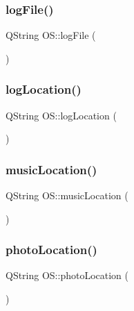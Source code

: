 \mbox{\label{classOS_a85848812c46025d92b9a061df85d9bce}} 
\subsubsection{\texorpdfstring{log\+File()}{logFile()}}
{\footnotesize\ttfamily Q\+String O\+S\+::log\+File (\begin{DoxyParamCaption}{ }\end{DoxyParamCaption})}

\mbox{\label{classOS_a5f0bcd7c973d5875be519ec3a06629f2}} 
\subsubsection{\texorpdfstring{log\+Location()}{logLocation()}}
{\footnotesize\ttfamily Q\+String O\+S\+::log\+Location (\begin{DoxyParamCaption}{ }\end{DoxyParamCaption})}

\mbox{\label{classOS_a611cc2d2496f6974b5087e8e2d3085e6}} 
\subsubsection{\texorpdfstring{music\+Location()}{musicLocation()}}
{\footnotesize\ttfamily Q\+String O\+S\+::music\+Location (\begin{DoxyParamCaption}{ }\end{DoxyParamCaption})}

\mbox{\label{classOS_afa7ce7d8541fbbd43d82f09f8662af44}} 
\subsubsection{\texorpdfstring{photo\+Location()}{photoLocation()}}
{\footnotesize\ttfamily Q\+String O\+S\+::photo\+Location (\begin{DoxyParamCaption}{ }\end{DoxyParamCaption})}

